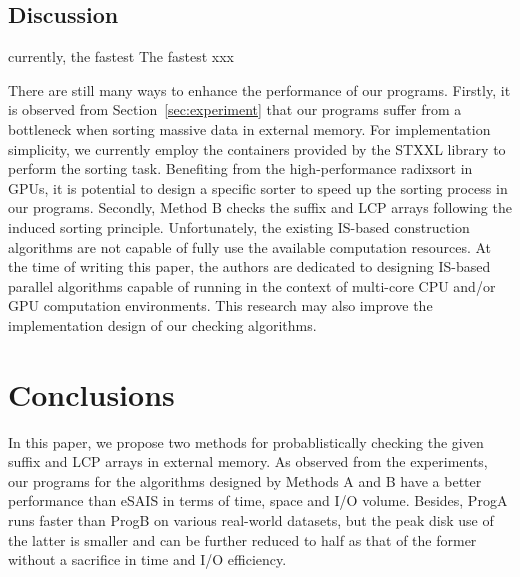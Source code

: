 \documentclass[10pt,journal,compsoc]{IEEEtran}
\begin{document}
	
\subsection{Discussion} \label{sec:discussion}

currently, the fastest  The fastest xxx

There are still many ways to enhance the performance of our programs. Firstly, it is observed from Section~\ref{sec:experiment} that our programs suffer from a bottleneck when sorting massive data in external memory. For implementation simplicity, we currently employ the containers provided by the STXXL library to perform the sorting task. Benefiting from the high-performance radixsort in GPUs, it is potential to design a specific sorter to speed up the sorting process in our programs. Secondly, Method B checks the suffix and LCP arrays following the induced sorting principle. Unfortunately, the existing IS-based construction algorithms are not capable of fully use the available computation resources. At the time of writing this paper, the authors are dedicated to designing IS-based parallel algorithms capable of running in the context of multi-core CPU and/or GPU computation environments. This research may also improve the implementation design of our checking algorithms. 

\section{Conclusions} \label{sec:conclusion}

In this paper, we propose two methods for probablistically checking the given suffix and LCP arrays in external memory. As observed from the experiments, our programs for the algorithms designed by Methods A and B have a better performance than eSAIS in terms of time, space and I/O volume. Besides, ProgA runs faster than ProgB on various real-world datasets, but the peak disk use of the latter is smaller and can be further reduced to half as that of the former without a sacrifice in time and I/O efficiency. 
\end{document}
